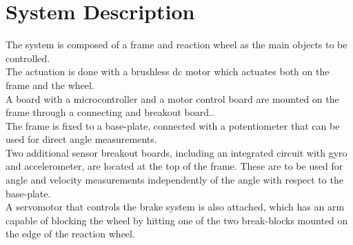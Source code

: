\chapter{System Description}\label{systemDescription}
The system is composed of a frame and reaction wheel as the main objects to be controlled.\\
The actuation is done with a brushless dc motor which actuates both on the frame and the wheel.\\ 
A board with a microcontroller and a motor control board are mounted on the frame through a connecting and breakout board..\\ 
The frame is fixed to a base-plate, connected with a potentiometer that can be used for direct angle measurements.\\ 
Two additional sensor breakout boards, including an integrated circuit with gyro and accelerometer, are located at the top of the frame. These are to be used for angle and velocity measurements independently of the angle with respect to the base-plate.\\ 
A servomotor that controls the brake system is also attached, which has an arm capable of blocking the wheel by hitting one of the two break-blocks mounted on the edge of the reaction wheel.

